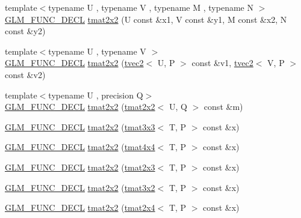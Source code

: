 \begin{DoxyCompactItemize}
\item 
{\footnotesize template$<$typename U , typename V , typename M , typename N $>$ }\\\hyperlink{setup_8hpp_ab2d052de21a70539923e9bcbf6e83a51}{G\+L\+M\+\_\+\+F\+U\+N\+C\+\_\+\+D\+E\+CL} \hyperlink{structglm_1_1detail_1_1tmat2x2_adef8daef1582260e30e727f31ec58fc4}{tmat2x2} (U const \&x1, V const \&y1, M const \&x2, N const \&y2)
\item 
{\footnotesize template$<$typename U , typename V $>$ }\\\hyperlink{setup_8hpp_ab2d052de21a70539923e9bcbf6e83a51}{G\+L\+M\+\_\+\+F\+U\+N\+C\+\_\+\+D\+E\+CL} \hyperlink{structglm_1_1detail_1_1tmat2x2_a09f5f84943ae5636f82d1483cc815ef3}{tmat2x2} (\hyperlink{structglm_1_1detail_1_1tvec2}{tvec2}$<$ U, P $>$ const \&v1, \hyperlink{structglm_1_1detail_1_1tvec2}{tvec2}$<$ V, P $>$ const \&v2)
\item 
{\footnotesize template$<$typename U , precision Q$>$ }\\\hyperlink{setup_8hpp_ab2d052de21a70539923e9bcbf6e83a51}{G\+L\+M\+\_\+\+F\+U\+N\+C\+\_\+\+D\+E\+CL} \hyperlink{structglm_1_1detail_1_1tmat2x2_a6a9b44f5626983a1f66171f8cecfbc8f}{tmat2x2} (\hyperlink{structglm_1_1detail_1_1tmat2x2}{tmat2x2}$<$ U, Q $>$ const \&m)
\item 
\hyperlink{setup_8hpp_ab2d052de21a70539923e9bcbf6e83a51}{G\+L\+M\+\_\+\+F\+U\+N\+C\+\_\+\+D\+E\+CL} \hyperlink{structglm_1_1detail_1_1tmat2x2_a291750bdcaf39932f079105ca4dd6633}{tmat2x2} (\hyperlink{structglm_1_1detail_1_1tmat3x3}{tmat3x3}$<$ T, P $>$ const \&x)
\item 
\hyperlink{setup_8hpp_ab2d052de21a70539923e9bcbf6e83a51}{G\+L\+M\+\_\+\+F\+U\+N\+C\+\_\+\+D\+E\+CL} \hyperlink{structglm_1_1detail_1_1tmat2x2_ad46d070d32a5455eddf99fea687b488d}{tmat2x2} (\hyperlink{structglm_1_1detail_1_1tmat4x4}{tmat4x4}$<$ T, P $>$ const \&x)
\item 
\hyperlink{setup_8hpp_ab2d052de21a70539923e9bcbf6e83a51}{G\+L\+M\+\_\+\+F\+U\+N\+C\+\_\+\+D\+E\+CL} \hyperlink{structglm_1_1detail_1_1tmat2x2_abe06c612421c4e601074d1e66772ae6a}{tmat2x2} (\hyperlink{structglm_1_1detail_1_1tmat2x3}{tmat2x3}$<$ T, P $>$ const \&x)
\item 
\hyperlink{setup_8hpp_ab2d052de21a70539923e9bcbf6e83a51}{G\+L\+M\+\_\+\+F\+U\+N\+C\+\_\+\+D\+E\+CL} \hyperlink{structglm_1_1detail_1_1tmat2x2_a4f224e4deddcbcd9f4b3109b595429e6}{tmat2x2} (\hyperlink{structglm_1_1detail_1_1tmat3x2}{tmat3x2}$<$ T, P $>$ const \&x)
\item 
\hyperlink{setup_8hpp_ab2d052de21a70539923e9bcbf6e83a51}{G\+L\+M\+\_\+\+F\+U\+N\+C\+\_\+\+D\+E\+CL} \hyperlink{structglm_1_1detail_1_1tmat2x2_ad9aa5899db04b6c8d78d31ebea8ea4c6}{tmat2x2} (\hyperlink{structglm_1_1detail_1_1tmat2x4}{tmat2x4}$<$ T, P $>$ const \&x)

\end{DoxyCompactItemize}
